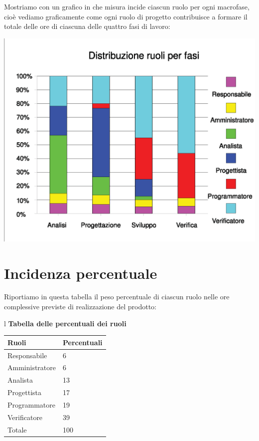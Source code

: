 \documentclass[11pt,titlepage,a4paper]{report}
\begin{document}
Mostriamo con un grafico in che misura incide ciascun ruolo per ogni macrofase,
cio\`e vediamo graficamente come ogni ruolo di progetto contribuisce a formare 
il totale delle ore di ciascuna delle quattro fasi di lavoro:
\begin{center}
\includegraphics [width=1\textwidth] {ruoliperFasi.eps}
\end{center}

\section{Incidenza percentuale}
Riportiamo in questa tabella il peso percentuale di ciascun ruolo nelle ore
complessive previste di realizzazione del prodotto:
\begin{table}[hbtp]
\large{
\begin{tabular}{l}
\Large{\textbf{\textsf{Tabella delle percentuali dei ruoli}}} \\
\begin{tabular}{||p{6cm}||p{4cm}||}
\hline
\textbf{Ruoli} & \textbf{Percentuali}\\
\hline
{Responsabile}&6\\ 
\hline 
{Amministratore} &6\\ 
\hline
{Analista} &13 \\
\hline
{Progettista} &17\\
\hline
{Programmatore} &19\\
\hline
{Verificatore} &39 \\
\hline
{Totale} &100 \\
\hline
\end{tabular} \\
\end{tabular}
}
\end{table}
\end{document}
